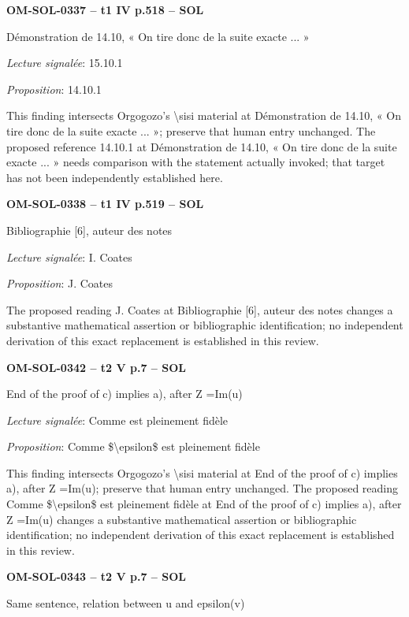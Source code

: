 \par\noindent\textbf{OM-SOL-0337 -- t1 IV p.518 -- SOL}\par
Démonstration de 14.10, « On tire donc de la suite exacte ... »\par
\emph{Lecture signalée}: 15.10.1\par
\emph{Proposition}: 14.10.1\par
This finding intersects Orgogozo's \textbackslash{}sisi material at Démonstration de 14.10, « On tire donc de la suite exacte ... »; preserve that human entry unchanged. The proposed reference 14.10.1 at Démonstration de 14.10, « On tire donc de la suite exacte ... » needs comparison with the statement actually invoked; that target has not been independently established here.\par
\par\noindent\textbf{OM-SOL-0338 -- t1 IV p.519 -- SOL}\par
Bibliographie [6], auteur des notes\par
\emph{Lecture signalée}: I. Coates\par
\emph{Proposition}: J. Coates\par
The proposed reading J. Coates at Bibliographie [6], auteur des notes changes a substantive mathematical assertion or bibliographic identification; no independent derivation of this exact replacement is established in this review.\par
\par\noindent\textbf{OM-SOL-0342 -- t2 V p.7 -- SOL}\par
End of the proof of c) implies a), after Z =\allowbreak  Im(u)\par
\emph{Lecture signalée}: Comme est pleinement fidèle\par
\emph{Proposition}: Comme \$\textbackslash{}epsilon\$ est pleinement fidèle\par
This finding intersects Orgogozo's \textbackslash{}sisi material at End of the proof of c) implies a), after Z =\allowbreak  Im(u); preserve that human entry unchanged. The proposed reading Comme \$\textbackslash{}epsilon\$ est pleinement fidèle at End of the proof of c) implies a), after Z =\allowbreak  Im(u) changes a substantive mathematical assertion or bibliographic identification; no independent derivation of this exact replacement is established in this review.\par
\par\noindent\textbf{OM-SOL-0343 -- t2 V p.7 -- SOL}\par
Same sentence, relation between u and epsilon(v)\par

